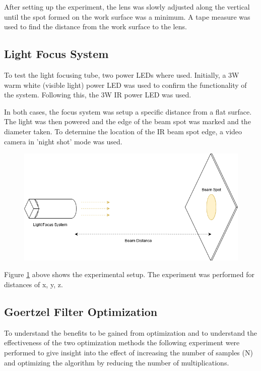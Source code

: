 After setting up the experiment, the lens was slowly adjusted along the vertical until the spot formed on the work surface was a minimum. A tape measure was used to find the distance from the work surface to the lens.

\subsection{Light Focus System}

To test the light focusing tube, two power LEDs where used. Initially, a 3W warm white (visible light) power LED was used to confirm the functionality of the system. Following this, the 3W IR power LED was used.

In both cases, the focus system was setup a specific distance from a flat surface. The light was then powered and the edge of the beam spot was marked and the diameter taken. To determine the location of the IR beam spot edge, a video camera in 'night shot' mode was used.

\begin{figure}[H]
	\centering
	\includegraphics[width=.7\linewidth]{figures/experimentation/beam_spot_experiement.png}
	\label{fig:focus_system_experiemnt}
\end{figure}

Figure \ref{fig:focus_system_experiemnt} above shows the experimental setup. The experiment was performed for distances of x, y, z.

\subsection{Goertzel Filter Optimization}

To understand the benefits to be gained from optimization and to understand the effectiveness of the two optimization methods the following experiment were performed to give insight into the effect of increasing the number of samples (N) and optimizing the algorithm by reducing the number of multiplications.

